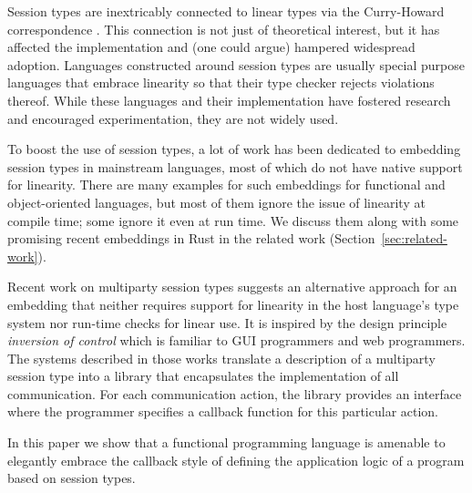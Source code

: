 \documentclass[acmsmall,screen]{acmart}
\begin{document}
Session types are inextricably connected to linear types via the
Curry-Howard correspondence
\cite{DBLP:conf/concur/CairesP10,DBLP:journals/mscs/CairesPT16,DBLP:journals/jfp/Wadler14}. 
This connection is not just of theoretical interest, but it
has affected the implementation and (one could argue) hampered widespread
adoption. Languages constructed around session types are usually
special purpose languages that embrace linearity so that their type
checker rejects violations thereof.
While these languages and their implementation have fostered research
and encouraged experimentation, they are not widely used.

To boost the use of session types, 
a lot of work has been dedicated to embedding session types in mainstream
languages, most of which do not have native support for linearity. 
There are many examples for such embeddings for functional
and object-oriented languages, but
most of them ignore the issue of linearity at compile time; some
ignore it even at run time. We discuss them along with some promising
recent embeddings in Rust in the
related work (Section~\ref{sec:related-work}).

Recent work on multiparty session types
\cite{DBLP:conf/cc/Miu0Y021,DBLP:journals/pacmpl/00020HNY20} suggests
an alternative approach for an embedding that neither requires support for
linearity in the host language's type system nor run-time checks for
linear use. It is 
inspired by the design principle \emph{inversion of control} which is
familiar to GUI programmers and web programmers. The systems described in
those works translate a description of a multiparty session type into
a library that encapsulates the implementation of all
communication. For each communication action, the library provides an
interface where the programmer specifies a callback function for this
particular action.

In this paper we show that a functional programming language is
amenable to elegantly embrace the callback style of defining the
application logic of a program based on session types.
\end{document}
